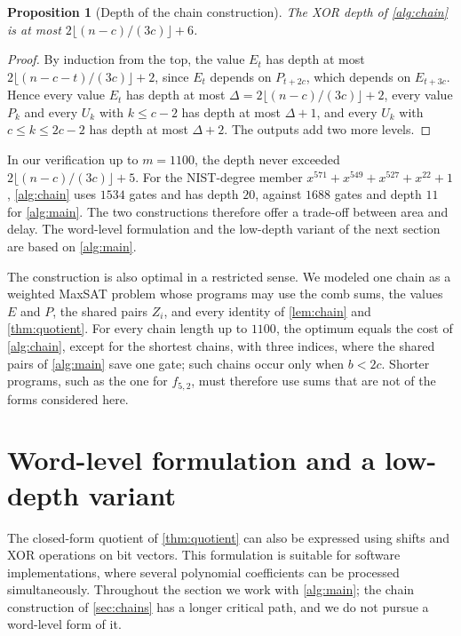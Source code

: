 \documentclass{ieeeaccess}
\theoremstyle{plain}
\newtheorem{proposition}[theorem]{Proposition}
\theoremstyle{definition}
\begin{document}
\begin{proposition}[Depth of the chain construction]\label{prop:chaindepth}
The XOR depth of \cref{alg:chain} is at most
$2\lfloor(n-c)/(3c)\rfloor+6$.
\end{proposition}

\begin{proof}
By induction from the top, the value $E_t$ has depth at most
$2\lfloor(n-c-t)/(3c)\rfloor+2$, since $E_t$ depends on $P_{t+2c}$, which
depends on $E_{t+3c}$. Hence every value $E_t$ has depth at most
$\Delta=2\lfloor(n-c)/(3c)\rfloor+2$, every value $P_k$ and every $U_k$ with
$k\le c-2$ has depth at most $\Delta+1$, and every $U_k$ with $c\le k\le 2c-2$
has depth at most $\Delta+2$. The outputs add two more levels.
\end{proof}

In our verification up to $m=1100$, the depth never exceeded
$2\lfloor(n-c)/(3c)\rfloor+5$. For the NIST-degree member
$x^{571}+x^{549}+x^{527}+x^{22}+1$, \cref{alg:chain} uses $1534$ gates and has
depth $20$, against $1688$ gates and depth $11$ for \cref{alg:main}. The two
constructions therefore offer a trade-off between area and delay. The
word-level formulation and the low-depth variant of the next section are based
on \cref{alg:main}.

The construction is also optimal in a restricted sense. We modeled one chain as
a weighted MaxSAT problem whose programs may use the comb sums, the values $E$
and $P$, the shared pairs $Z_i$, and every identity of \cref{lem:chain} and
\cref{thm:quotient}. For every chain length up to $1100$, the optimum equals
the cost of \cref{alg:chain}, except for the shortest chains, with three
indices, where the shared pairs of \cref{alg:main} save one gate; such chains
occur only when $b<2c$. Shorter programs, such as the one for $f_{5,2}$, must
therefore use sums that are not of the forms considered here.


\section{Word-level formulation and a low-depth variant}\label{sec:word}

The closed-form quotient of \cref{thm:quotient} can also be expressed using
shifts and XOR operations on bit vectors. This formulation is suitable for
software implementations, where several polynomial coefficients can be processed
simultaneously. Throughout the section we work with \cref{alg:main}; the chain
construction of \cref{sec:chains} has a longer critical path, and we do not
pursue a word-level form of it.
\end{document}
